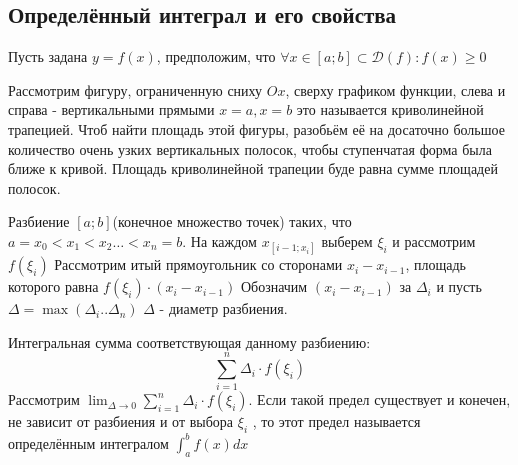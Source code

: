 \documentclass[oneside]{book}
\begin{document}
\begin{enumerate}
\begin{itemize}
\begin{enumerate}
\setcounter{chapter}{34} %
\chapter[Определённый интеграл]{Определённый интеграл и его свойства}
Пусть задана $y = f(x)$, предположим, что $\forall x \in [a;b] \subset \mathcal{D}(f): f(x) \geq 0$
\begin{center}
   {\pgfqpoint{-1pt}{-1pt}}%
   {\pgfqpoint{10pt}{10pt}}%
   {\pgfqpoint{9pt}{9pt}}%
   {
     \pgfsetlinewidth{0.4pt}
     \pgfpathmoveto{\pgfqpoint{0pt}{0pt}}
     \pgfpathlineto{\pgfqpoint{9.1pt}{9.1pt}}
    }
    \end{center}

Рассмотрим фигуру, ограниченную сниху $Ox$, сверху графиком функции, слева и справа - вертикальными прямыми
$x = a, x = b$ это называется криволинейной трапецией. Чтоб найти площадь этой фигуры, разобьём её на досаточно
большое количество очень узких вертикальных полосок, чтобы ступенчатая форма была ближе к кривой. Площадь криволинейной
трапеции буде равна сумме площадей полосок.
\par Разбиение $[a;b]$(конечное множество точек) таких, что $a = x_0 <x_1 < x_2 \dots < x_n = b$. На каждом $x_{[i-1;x_i]}$
выберем $\xi_i$ и рассмотрим $f(\xi_i)$ Рассмотрим итый прямоугольник со сторонами $x_i - x_{i-1}$, площадь которого равна
$f(\xi_i)\cdot (x_i - x_{i-1})$ Обозначим $(x_i - x_{i-1})$ за $\Delta_i$ и пусть $\Delta = \max(\Delta_i .. \Delta_n)$
$\Delta$ - диаметр разбиения.
\par Интегральная сумма соответствующая данному разбиению: $$
  \sum_{i = 1}^n \Delta_i \cdot f(\xi_i)
$$
Рассмотрим $\lim_{\Delta \rightarrow 0}{\sum_{i = 1}^n \Delta_i \cdot f(\xi_i)} $. Если такой предел существует и конечен, не зависит от
разбиения и от выбора $\xi_i$ , то этот предел называется определённым интегралом $\int_{a}^b f(x) dx$



\end{enumerate}
\end{itemize}
\end{enumerate}
\end{document}

